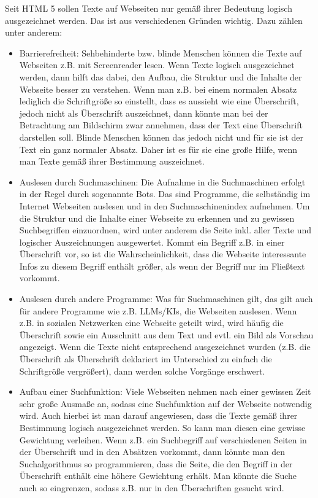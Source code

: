 Seit HTML 5 sollen Texte auf Webseiten nur gemäß ihrer Bedeutung logisch ausgezeichnet werden. Das ist aus verschiedenen Gründen wichtig. Dazu zählen unter anderem:
\begin{itemize}
    \item Barrierefreiheit: Sehbehinderte bzw. blinde Menschen können die Texte auf Webseiten z.B. mit Screenreader lesen. Wenn Texte logisch ausgezeichnet werden, dann hilft das dabei, den Aufbau, die Struktur und die Inhalte der Webseite besser zu verstehen. Wenn man z.B. bei einem normalen Absatz lediglich die Schriftgröße so einstellt, dass es aussieht wie eine Überschrift, jedoch nicht als Überschrift auszeichnet, dann könnte man bei der Betrachtung am Bildschirm zwar annehmen, dass der Text eine Überschrift darstellen soll. Blinde Menschen können das jedoch nicht und für sie ist der Text ein ganz normaler Absatz. Daher ist es für sie eine große Hilfe, wenn man Texte gemäß ihrer Bestimmung auszeichnet.
    \item Auslesen durch Suchmaschinen: Die Aufnahme in die Suchmaschinen erfolgt in der Regel durch sogenannte Bots. Das sind Programme, die selbständig im Internet Webseiten auslesen und in den Suchmaschinenindex aufnehmen. Um die Struktur und die Inhalte einer Webseite zu erkennen und zu gewissen Suchbegriffen einzuordnen, wird unter anderem die Seite inkl. aller Texte und logischer Auszeichnungen ausgewertet. Kommt ein Begriff z.B. in einer Überschrift vor, so ist die Wahrscheinlichkeit, dass die Webseite interessante Infos zu diesem Begriff enthält größer, als wenn der Begriff nur im Fließtext vorkommt.
    \item Auslesen durch andere Programme: Was für Suchmaschinen gilt, das gilt auch für andere Programme wie z.B. LLMs/KIs, die Webseiten auslesen. Wenn z.B. in sozialen Netzwerken eine Webseite geteilt wird, wird häufig die Überschrift sowie ein Ausschnitt aus dem Text und evtl. ein Bild als Vorschau angezeigt. Wenn die Texte nicht entsprechend ausgezeichnet wurden (z.B. die Überschrift als Überschrift deklariert im Unterschied zu einfach die Schriftgröße vergrößert), dann werden solche Vorgänge erschwert.
    \item Aufbau einer Suchfunktion: Viele Webseiten nehmen nach einer gewissen Zeit sehr große Ausmaße an, sodass eine Suchfunktion auf der Webseite notwendig wird. Auch hierbei ist man darauf angewiesen, dass die Texte gemäß ihrer Bestimmung logisch ausgezeichnet werden. So kann man diesen eine gewisse Gewichtung verleihen. Wenn z.B. ein Suchbegriff auf verschiedenen Seiten in der Überschrift und in den Absätzen vorkommt, dann könnte man den Suchalgorithmus so programmieren, dass die Seite, die den Begriff in der Überschrift enthält eine höhere Gewichtung erhält. Man könnte die Suche auch so eingrenzen, sodass z.B. nur in den Überschriften gesucht wird.
\end{itemize}
